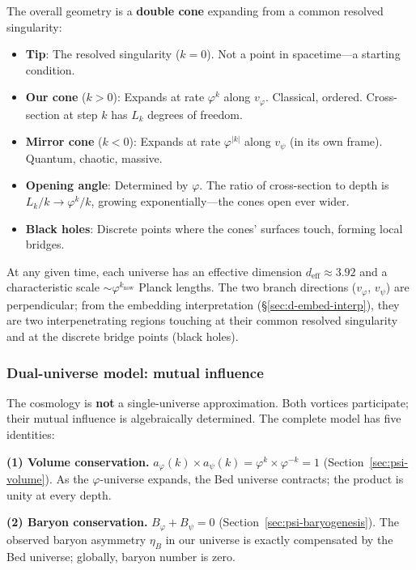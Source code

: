 \documentclass[12pt,a4paper]{article}
\newcommand{\bed}{Bed universe}
\begin{document}
The overall geometry is a \textbf{double cone} expanding from a common resolved singularity:

\begin{itemize}
\item \textbf{Tip}: The resolved singularity ($k = 0$). Not a point in spacetime---a starting condition.
\item \textbf{Our cone} ($k > 0$): Expands at rate $\varphi^k$ along $v_\varphi$. Classical, ordered. Cross-section at step $k$ has $L_k$ degrees of freedom.
\item \textbf{Mirror cone} ($k < 0$): Expands at rate $\varphi^{|k|}$ along $v_\psi$ (in its own frame). Quantum, chaotic, massive.
\item \textbf{Opening angle}: Determined by $\varphi$. The ratio of cross-section to depth is $L_k/k \to \varphi^k/k$, growing exponentially---the cones open ever wider.
\item \textbf{Black holes}: Discrete points where the cones' surfaces touch, forming local bridges.
\end{itemize}

\noindent At any given time, each universe has an effective dimension $d_{\mathrm{eff}} \approx 3.92$ and a characteristic scale $\sim \varphi^{k_{\mathrm{now}}}$ Planck lengths. The two branch directions ($v_\varphi$, $v_\psi$) are perpendicular; from the embedding interpretation (\S\ref{sec:d-embed-interp}), they are two interpenetrating regions touching at their common resolved singularity and at the discrete bridge points (black holes).

\subsubsection{Dual-universe model: mutual influence}
\label{sec:complete-dual-model}

The cosmology is \textbf{not} a single-universe approximation. Both vortices participate; their mutual influence is algebraically determined. The complete model has five identities:

\textbf{(1) Volume conservation.} $a_\varphi(k) \times a_\psi(k) = \varphi^k \times \varphi^{-k} = 1$ (Section~\ref{sec:psi-volume}). As the $\varphi$-universe expands, the \bed{} contracts; the product is unity at every depth.

\textbf{(2) Baryon conservation.} $B_\varphi + B_\psi = 0$ (Section~\ref{sec:psi-baryogenesis}). The observed baryon asymmetry $\eta_B$ in our universe is exactly compensated by the \bed{}; globally, baryon number is zero.
\end{document}
